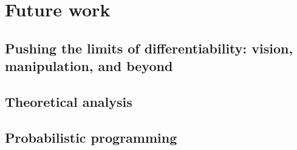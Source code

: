 
\section{Future work}



\subsection{Pushing the limits of differentiability: vision, manipulation, and beyond}





\subsection{Theoretical analysis}



\subsection{Probabilistic programming}


